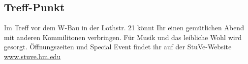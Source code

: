 \subsection{Treff-Punkt}
Im Treff vor dem W-Bau in der Lothstr. 21 könnt 
Ihr einen gemütlichen Abend mit anderen 
Kommilitonen verbringen. Für Musik und das 
leibliche Wohl wird gesorgt.\doublebreak
Öffnungszeiten und Special Event findet ihr auf der StuVe-Website 
\url{www.stuve.hm.edu}